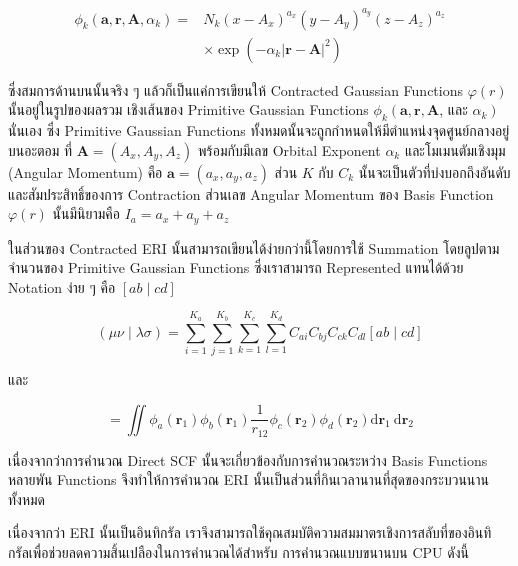 \begin{equation}
  \begin{aligned}
    \phi_k\left(\boldsymbol{a}, \boldsymbol{r}, \boldsymbol{A}, \alpha_k\right)
    =
     & N_k\left(x-A_x\right)^{a_x}\left(y-A_y\right)^{a_y}\left(z-A_z\right)^{a_z} \\
     & \times \exp \left(-\alpha_k|\boldsymbol{r}-\boldsymbol{A}|^2\right)
  \end{aligned}
\end{equation}

\noindent ซึ่งสมการด้านบนนั้นจริง ๆ แล้วก็เป็นแค่การเขียนให้ Contracted Gaussian Functions $\varphi(r)$ นั้นอยู่ในรูปของผลรวม%
เชิงเส้นของ Primitive Gaussian Functions $\phi_k\left(\boldsymbol{a}, \boldsymbol{r}, \boldsymbol{A}\right.$, และ
  $\left.\alpha_k\right)$ นั่นเอง ซึ่ง Primitive Gaussian Functions ทั้งหมดนั้นจะถูกกำหนดให้มีตำแหน่งจุดศูนย์กลางอยู่บนอะตอม%
ที่ $\boldsymbol{A} = \left(A_x, A_y, A_z\right)$ พร้อมกับมีเลข Orbital Exponent $\alpha_k$ และโมเมนตัมเชิงมุม (Angular
Momentum) คือ $\boldsymbol{a} = \left(a_x, a_y, a_z\right)$ ส่วน $K$ กับ $C_k$ นั้นจะเป็นตัวที่บ่งบอกถึงอันดับและสัมประสิทธิ์ของการ
Contraction ส่วนเลข Angular Momentum ของ Basis Function $\varphi(r)$ นั้นมีนิยามคือ $I_a = a_x + a_y + a_z$

ในส่วนของ Contracted ERI นั้นสามารถเขียนได้ง่ายกว่านี้โดยการใช้ Summation โดยลูปตามจำนวนของ Primitive Gaussian Functions
ซึ่งเราสามารถ Represented แทนได้ด้วย Notation ง่าย ๆ คือ $[a b \mid c d]$

\begin{equation}
  (\mu \nu \mid \lambda \sigma)
  =
  \sum_{i=1}^{K_a}
  \sum_{j=1}^{K_b}
  \sum_{k=1}^{K_c}
  \sum_{l=1}^{K_d}
  C_{a i} C_{b j} C_{c k} C_{d l}[a b \mid c d]
\end{equation}

\noindent และ

\begin{equation}
  [a b \mid c d]
  =
  \iint \phi_a\left(\boldsymbol{r}_1\right) \phi_b\left(\boldsymbol{r}_1\right)
  \frac{1}{r_{12}}
  \phi_c\left(\boldsymbol{r}_2\right) \phi_d\left(\boldsymbol{r}_2\right) \mathrm{d} \boldsymbol{r}_1
  \mathrm{~d} \boldsymbol{r}_2
\end{equation}

เนื่องจากว่าการคำนวณ Direct SCF นั้นจะเกี่ยวข้องกับการคำนวณระหว่าง Basis Functions หลายพัน Functions จึงทำให้การคำนวณ ERI
นั้นเป็นส่วนที่กินเวลานานที่สุดของกระบวนนานทั้งหมด

เนื่องจากว่า ERI นั้นเป็นอินทิกรัล เราจึงสามารถใช้คุณสมบัติความสมมาตรเชิงการสลับที่ของอินทิกรัลเพื่อช่วยลดความสิ้นเปลืองในการคำนวณได้สำหรับ%
การคำนวณแบบขนานบน CPU ดังนี้

